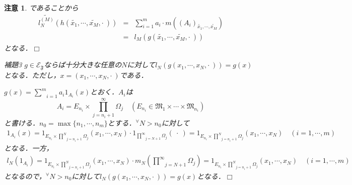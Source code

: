 \documentclass[a4paper,11pt]{jsarticle}
\def\qed{\hfill $\Box$}
\newtheorem{attention}{注意}
\begin{document}
\begin{attention}
であることから
\begin{eqnarray*}
\widetilde{l^{(M)}_N}(h(\widetilde{x_1},\cdots,\widetilde{x_M},\cdot{\ }))&=&\sum_{i=1}^m a_i \cdot m((A_i)_{\widetilde{x_1},\cdots,\widetilde{x_M}}) \\
&=&l_M(g(\widetilde{x_1},\cdots,\widetilde{x_M},\cdot{\ }))
\end{eqnarray*}
となる．\qed
\begin{itembox}[l]{補題3}
$g\in\mathcal{E}_\mathfrak{F}$ならば十分大きな任意の$N$に対して$l_N(g(x_1,\cdots,x_N,\cdot{\ }))=g(x)$となる．ただし，$x=(x_1,\cdots,x_N,\cdot{\ })$である．
\end{itembox}
$g(x)=\underset{i=1}{\overset{m}{\sum}}a_i1_{A_i}(x)$とおく．$A_i$は
\begin{equation*}
A_i=E_{n_i}\times\prod_{j=n_i+1}^\infty\Omega_j \quad (E_{n_i}\in \mathfrak{M}_1\times\cdots\times\mathfrak{M}_{n_i})
\end{equation*}
と書ける．$n_0=\max\{n_1,\cdots,n_m\}$とする．$^\forall N>n_0$に対して
\begin{eqnarray*}
1_{A_i}(x)=1_{E_{n_i}\times\underset{j=n_i+1}{\overset{N}{\prod}}\Omega_j}(x_1,\cdots,x_N) \cdot 1_{\underset{j=N+1}{\overset{\infty}{\prod}}\Omega_j}({\ }\cdot{\ })=1_{E_{n_i}\times\underset{j=n_i+1}{\overset{N}{\prod}}\Omega_j}(x_1,\cdots,x_N) \quad(i=1,\cdots,m)
\end{eqnarray*}
となる．一方，
\begin{eqnarray*}
l_N(1_{A_i})=1_{E_{n_i}\times\underset{j=n_i+1}{\overset{N}{\prod}}\Omega_j}(x_1,\cdots,x_N)\cdot m_N\left(\underset{j=N+1}{\overset{\infty}{\prod}}\Omega_j\right)=1_{E_{n_i}\times\underset{j=n_i+1}{\overset{N}{\prod}}\Omega_j}(x_1,\cdots,x_N) \quad(i=1,\cdots,m)
\end{eqnarray*}
となるので，$^\forall N>n_0$に対して$l_N(g(x_1,\cdots,x_N,\cdot{\ }))=g(x)$となる．\qed
\end{attention}
\end{document}
